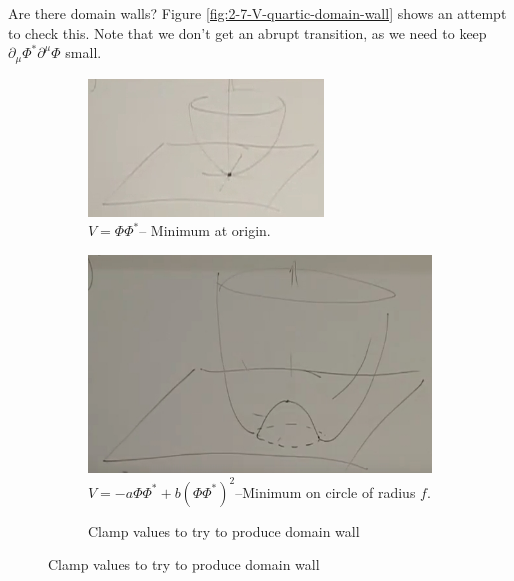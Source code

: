 \documentclass[]{article}
\begin{document}
Are there domain walls? Figure \ref{fig:2-7-V-quartic-domain-wall} shows an attempt to check this. Note that we don't get an abrupt transition, as we need to keep $\partial_\mu \Phi^* \partial^\mu \Phi$ small.

\begin{figure}[H]
	\caption{Potentials}\label{fig:s-7-potentials}
	\begin{subfigure}[t]{0.5\textwidth}
		\caption{ $V=\Phi \Phi^*$-- Minimum at origin.}\label{fig:2-7-V-quad}
		\includegraphics[width=\textwidth]{2-7-V-quad}
	\end{subfigure}
	\begin{subfigure}[t]{0.5\textwidth}
		\caption{$V=-a \Phi \Phi^* + b (\Phi \Phi^*)^2$--Minimum on circle of radius $f$.}\label{fig:2-7-V-quartic}
		\includegraphics[width=\textwidth]{2-7-V-quartic}
	\end{subfigure}
	\begin{subfigure}[t]{0.5\textwidth}
		\caption{Clamp values to try to produce domain wall}\label{fig:2-7-V-quartic-domain-wall-ab}

\end{subfigure}
\end{figure}
\end{document}
